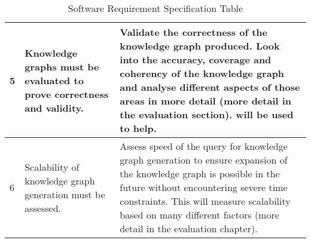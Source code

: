 \begin{longtable}{|p{2.25cm}|p{5.5cm}|p{5.5cm}|}
5&
Knowledge graphs must be evaluated to prove correctness and validity. &
Validate the correctness of the knowledge graph produced. Look into the accuracy, coverage and coherency of the knowledge graph and analyse different aspects of those areas in more detail (more detail in the evaluation section). \cite{knowledgegraphevaulationbook} will be used to help. \\ 
\hline

6&
Scalability of knowledge graph generation must be assessed. &
Assess speed of the query for knowledge graph generation to ensure expansion of the knowledge graph is possible in the future without encountering severe time constraints. This will measure scalability based on many different factors (more detail in the evaluation chapter). 
\hline
\caption{Software Requirement Specification Table}
\end{longtable}

